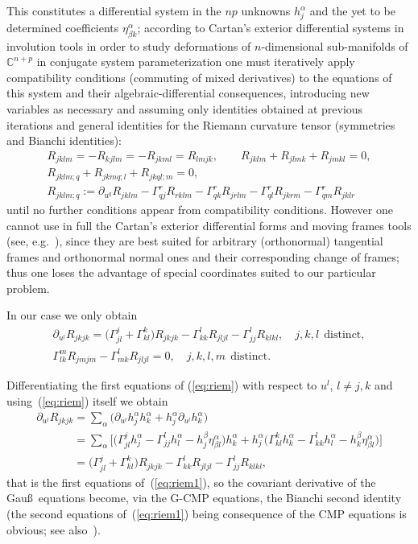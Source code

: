 \documentclass[pdftex]{sigma}
\begin{document}
This constitutes a dif\/ferential system in the $np$ unknowns
$h_j^{\alpha}$ and the yet to be determined coef\/f\/icients
$\eta_{\beta k}^{\alpha}$; according to Cartan's exterior
dif\/ferential systems in involution tools in order to study
deformations of $n$-dimensional sub-manifolds of
$\mathbb{C}^{n+p}$ in conjugate system para\-me\-terization one must
iteratively apply compatibility conditions (commuting of mixed
derivatives) to the equations of this system and their
algebraic-dif\/ferential consequences, introducing new variables as
necessary and assuming only identities obtained at previous
iterations and general identities for the Riemann curvature tensor
(symmetries and Bianchi identities):
\begin{gather*}
R_{jklm}=-R_{kjlm}=-R_{jkml}=R_{lmjk},\qquad
R_{jklm}+R_{jlmk}+R_{jmkl}=0,\\ R_{jklm;q}+R_{jkmq;l}+R_{jkql;m}=0,
\\
R_{jklm;q}:=\partial_{u^q}R_{jklm}-\Gamma_{qj}^rR_{rklm}-\Gamma_{qk}^rR_{jrlm}
-\Gamma_{ql}^rR_{jkrm}-\Gamma_{qm}^rR_{jklr}
\end{gather*}
until no further conditions appear from compatibility conditions.
However one cannot use in full the Cartan's exterior dif\/ferential
forms and moving frames tools (see, e.g.~\cite{B}), since
they are best suited for arbitrary (orthonormal) tangential frames
and orthonormal normal ones and their corresponding change of
frames; thus one loses the advantage of special coordinates suited
to our particular problem.

In our case we only obtain
\begin{gather}
\partial_{u^l}R_{jkjk}=\big(\Gamma_{jl}^j+\Gamma_{kl}^k\big)R_{jkjk}-\Gamma_{kk}^lR_{jljl}-\Gamma_{jj}^lR_{klkl},\quad
j,k,l\ \ \mathrm{distinct},\nonumber\\
\Gamma_{lk}^mR_{jmjm}-\Gamma_{mk}^lR_{jljl}=0,\quad  j,k,l,m \ \
\mathrm{distinct}.\label{eq:riem1}
\end{gather}

\begin{remark}
Dif\/ferentiating the f\/irst equations of (\ref{eq:riem}) with
respect to $u^l$, $l\neq j,k$ and using~(\ref{eq:riem}) itself we
obtain
\begin{gather*}
\partial_{u^l}R_{jkjk}=\sum_{\alpha}
\big(\partial_{u^l}h_j^{\alpha}h_k^{\alpha}+h_j^{\alpha}\partial_{u^l}h_k^{\alpha}\big)\\
\phantom{\partial_{u^l}R_{jkjk}}{}
=\sum_{\alpha}\big[\big(\Gamma_{jl}^jh_j^{\alpha}-\Gamma_{jj}^lh_l^{\alpha}-h_j^{\beta}\eta_{\beta
l}^{\alpha}\big)h_k^{\alpha}+
h_j^{\alpha}\big(\Gamma_{kl}^kh_k^{\alpha}-\Gamma_{kk}^lh_l^{\alpha}-h_k^{\beta}\eta_{\beta
l}^{\alpha}\big)\big]\\
\phantom{\partial_{u^l}R_{jkjk}}{}
=\big(\Gamma_{jl}^j+\Gamma_{kl}^k\big)R_{jkjk}-\Gamma_{kk}^lR_{jljl}-\Gamma_{jj}^lR_{klkl},
\end{gather*}
that is the f\/irst equations of~(\ref{eq:riem1}), so the covariant
derivative of the Gau\ss\ equations become, via the G-CMP
equations, the Bianchi second identity (the second equations of~(\ref{eq:riem1}) being consequence of the CMP equations is obvious; see also~\cite{B}).
\end{remark}
\end{document}
